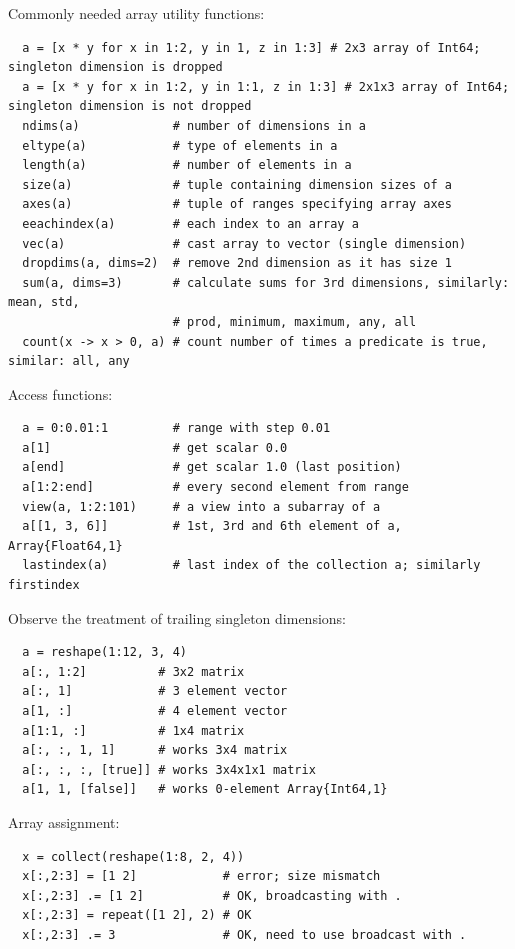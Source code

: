\documentclass[10pt,a4paper]{article}
\begin{document}
Commonly needed array utility functions:
\begin{lstlisting}
  a = [x * y for x in 1:2, y in 1, z in 1:3] # 2x3 array of Int64; singleton dimension is dropped
  a = [x * y for x in 1:2, y in 1:1, z in 1:3] # 2x1x3 array of Int64; singleton dimension is not dropped
  ndims(a)             # number of dimensions in a
  eltype(a)            # type of elements in a
  length(a)            # number of elements in a
  size(a)              # tuple containing dimension sizes of a
  axes(a)              # tuple of ranges specifying array axes
  eeachindex(a)        # each index to an array a
  vec(a)               # cast array to vector (single dimension)
  dropdims(a, dims=2)  # remove 2nd dimension as it has size 1
  sum(a, dims=3)       # calculate sums for 3rd dimensions, similarly: mean, std,
                       # prod, minimum, maximum, any, all
  count(x -> x > 0, a) # count number of times a predicate is true, similar: all, any
\end{lstlisting}

Access functions:
\begin{lstlisting}
  a = 0:0.01:1         # range with step 0.01
  a[1]                 # get scalar 0.0
  a[end]               # get scalar 1.0 (last position)
  a[1:2:end]           # every second element from range
  view(a, 1:2:101)     # a view into a subarray of a
  a[[1, 3, 6]]         # 1st, 3rd and 6th element of a, Array{Float64,1}
  lastindex(a)         # last index of the collection a; similarly firstindex
\end{lstlisting}

Observe the treatment of trailing singleton dimensions:
\begin{lstlisting}
  a = reshape(1:12, 3, 4)
  a[:, 1:2]          # 3x2 matrix
  a[:, 1]            # 3 element vector
  a[1, :]            # 4 element vector
  a[1:1, :]          # 1x4 matrix
  a[:, :, 1, 1]      # works 3x4 matrix
  a[:, :, :, [true]] # works 3x4x1x1 matrix
  a[1, 1, [false]]   # works 0-element Array{Int64,1}
\end{lstlisting}

Array assignment:
\begin{lstlisting}
  x = collect(reshape(1:8, 2, 4))
  x[:,2:3] = [1 2]            # error; size mismatch
  x[:,2:3] .= [1 2]           # OK, broadcasting with .
  x[:,2:3] = repeat([1 2], 2) # OK
  x[:,2:3] .= 3               # OK, need to use broadcast with .
\end{lstlisting}
\end{document}
